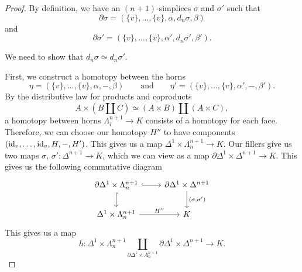 \documentclass[main.tex]{subfiles}
\begin{document}
\begin{proof}
  By definition, we have an $(n+1)$-simplices $\sigma$ and $\sigma'$ such that
  \begin{equation*}
    \partial\sigma = (\{v\}, \ldots, \{v\}, \alpha, d_{n}\sigma, \beta)
  \end{equation*}
  and
  \begin{equation*}
    \partial\sigma' = (\{v\}, \ldots, \{v\}, \alpha', d_{n}\sigma', \beta').
  \end{equation*}

  We need to show that $d_{n}\sigma \simeq d_{n} \sigma'$.

  First, we construct a homotopy between the horns
  \begin{equation*}
    \eta = (\{v\}, \ldots, \{v\}, \alpha, -, \beta) \qquad\text{and}\qquad \eta' = (\{v\}, \ldots, \{v\}, \alpha', -, \beta').
  \end{equation*}
  By the distributive law for products and coproducts
  \begin{equation*}
    A \times (B \amalg C) \simeq (A \times B) \amalg (A \times C),
  \end{equation*}
  a homotopy between horns $\Lambda^{n+1}_{i} \to K$ consists of a homotopy for each face. Therefore, we can choose our homotopy $H''$ to have components $(\mathrm{id}_{v}, \ldots, \mathrm{id}_{v}, H, -, H')$. This gives us a map $\Delta^{1} \times \Lambda^{n+1}_{n} \to K$. Our fillers give us two maps $\sigma$, $\sigma'\colon \Delta^{n+1} \to K$, which we can view as a map $\partial\Delta^{1} \times \Delta^{n+1} \to K$. This gives us the following commutative diagram
  \begin{equation*}
    \begin{tikzcd}
      \partial \Delta^{1} \times \Lambda^{n+1}_{n}
      \arrow[r, hookrightarrow]
      \arrow[d, hookrightarrow]
      & \partial \Delta^{1} \times \Delta^{n+1}
      \arrow[d, "({\sigma, \sigma'})"]
      \\
      \Delta^{1} \times \Lambda^{n+1}_{n}
      \arrow[r, "H''"]
      & K
    \end{tikzcd}
  \end{equation*}
  This gives us a map
  \begin{equation*}
    h\colon \Delta^{1} \times \Lambda^{n+1}_{n} \coprod_{\partial \Delta^{1} \times \Lambda^{n+1}_{n}} \partial \Delta^{1} \times \Delta^{n+1} \to K.
  \end{equation*}


\end{proof}
\end{document}
